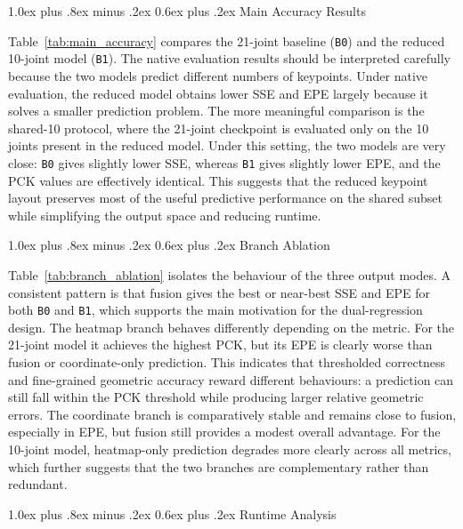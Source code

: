 \documentclass[10pt,letterpaper,twocolumn]{article}
\makeatletter
\renewcommand\subsection{\@startsection{subsection}{2}{\z@}%
  {1.0ex plus .8ex minus .2ex}%
  {0.6ex plus .2ex}%
  {\normalfont\itshape}}
\makeatother
\begin{document}
\subsection{Main Accuracy Results}

Table~\ref{tab:main_accuracy} compares the 21-joint baseline (\texttt{B0}) and the reduced 10-joint model (\texttt{B1}). The native evaluation results should be interpreted carefully because the two models predict different numbers of keypoints. Under native evaluation, the reduced model obtains lower SSE and EPE largely because it solves a smaller prediction problem. The more meaningful comparison is the shared-10 protocol, where the 21-joint checkpoint is evaluated only on the 10 joints present in the reduced model. Under this setting, the two models are very close: \texttt{B0} gives slightly lower SSE, whereas \texttt{B1} gives slightly lower EPE, and the PCK values are effectively identical. This suggests that the reduced keypoint layout preserves most of the useful predictive performance on the shared subset while simplifying the output space and reducing runtime.

\subsection{Branch Ablation}

Table~\ref{tab:branch_ablation} isolates the behaviour of the three output modes. A consistent pattern is that fusion gives the best or near-best SSE and EPE for both \texttt{B0} and \texttt{B1}, which supports the main motivation for the dual-regression design. The heatmap branch behaves differently depending on the metric. For the 21-joint model it achieves the highest PCK, but its EPE is clearly worse than fusion or coordinate-only prediction. This indicates that thresholded correctness and fine-grained geometric accuracy reward different behaviours: a prediction can still fall within the PCK threshold while producing larger relative geometric errors. The coordinate branch is comparatively stable and remains close to fusion, especially in EPE, but fusion still provides a modest overall advantage. For the 10-joint model, heatmap-only prediction degrades more clearly across all metrics, which further suggests that the two branches are complementary rather than redundant.

\subsection{Runtime Analysis}
\end{document}
